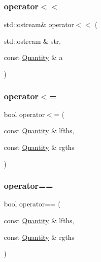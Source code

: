 \mbox{\label{classmunits_1_1_quantity_a26328f678ccbddf64026c4f217938afb}} 
\subsubsection{\texorpdfstring{operator$<$$<$}{operator<<}}
{\footnotesize\ttfamily std\+::ostream\& operator$<$$<$ (\begin{DoxyParamCaption}\item[{std\+::ostream \&}]{str,  }\item[{const \hyperlink{classmunits_1_1_quantity}{Quantity} \&}]{a }\end{DoxyParamCaption})\hspace{0.3cm}{\ttfamily [friend]}}

\mbox{\label{classmunits_1_1_quantity_a6ddc2fc0e787211815087612a60c35d1}} 
\subsubsection{\texorpdfstring{operator$<$=}{operator<=}}
{\footnotesize\ttfamily bool operator$<$= (\begin{DoxyParamCaption}\item[{const \hyperlink{classmunits_1_1_quantity}{Quantity} \&}]{lfths,  }\item[{const \hyperlink{classmunits_1_1_quantity}{Quantity} \&}]{rgths }\end{DoxyParamCaption})\hspace{0.3cm}{\ttfamily [friend]}}

\mbox{\label{classmunits_1_1_quantity_ab8fa0c93b87037ad0a27eec194454b60}} 
\subsubsection{\texorpdfstring{operator==}{operator==}}
{\footnotesize\ttfamily bool operator== (\begin{DoxyParamCaption}\item[{const \hyperlink{classmunits_1_1_quantity}{Quantity} \&}]{lfths,  }\item[{const \hyperlink{classmunits_1_1_quantity}{Quantity} \&}]{rgths }\end{DoxyParamCaption})\hspace{0.3cm}{\ttfamily [friend]}}

